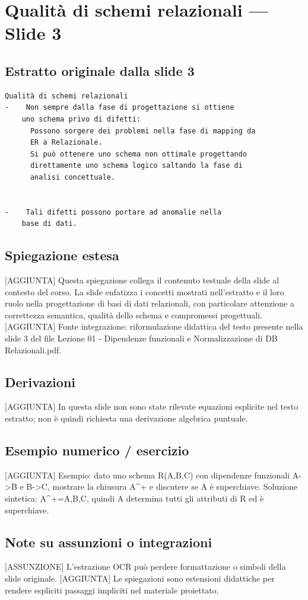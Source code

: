 \documentclass[11pt]{article}
\begin{document}
\section{Qualità di schemi relazionali --- Slide 3}
\subsection*{Estratto originale dalla slide 3}
\begin{lstlisting}
Qualità di schemi relazionali
-    Non sempre dalla fase di progettazione si ottiene
    uno schema privo di difetti:
      Possono sorgere dei problemi nella fase di mapping da
      ER a Relazionale.
      Si può ottenere uno schema non ottimale progettando
      direttamente uno schema logico saltando la fase di
      analisi concettuale.


-    Tali difetti possono portare ad anomalie nella
    base di dati.
\end{lstlisting}
\subsection*{Spiegazione estesa}
[AGGIUNTA] Questa spiegazione collega il contenuto testuale della slide al contesto del corso. La slide enfatizza i concetti mostrati nell'estratto e il loro ruolo nella progettazione di basi di dati relazionali, con particolare attenzione a correttezza semantica, qualità dello schema e compromessi progettuali.
[AGGIUNTA] Fonte integrazione: riformulazione didattica del testo presente nella slide 3 del file Lezione 01 - Dipendenze funzionali e Normalizzazione di DB Relazionali.pdf.
\subsection*{Derivazioni}
[AGGIUNTA] In questa slide non sono state rilevate equazioni esplicite nel testo estratto; non è quindi richiesta una derivazione algebrica puntuale.
\subsection*{Esempio numerico / esercizio}
[AGGIUNTA] Esempio: dato uno schema R(A,B,C) con dipendenze funzionali A->B e B->C, mostrare la chiusura A^+ e discutere se A è superchiave. Soluzione sintetica: A^+={A,B,C}, quindi A determina tutti gli attributi di R ed è superchiave.
\subsection*{Note su assunzioni o integrazioni}
[ASSUNZIONE] L'estrazione OCR può perdere formattazione o simboli della slide originale.
[AGGIUNTA] Le spiegazioni sono estensioni didattiche per rendere espliciti passaggi impliciti nel materiale proiettato.
\end{document}
